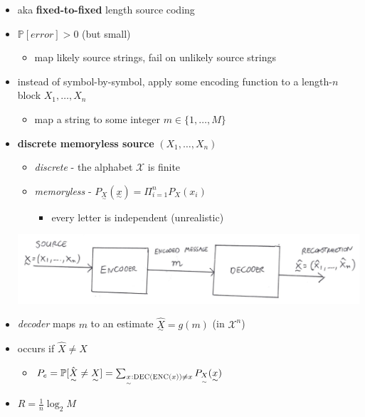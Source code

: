 \documentclass[10pt, landscape]{article}
\begin{document}
\begin{multicols*}{4}
  \begin{itemize}
    \item aka \textbf{fixed-to-fixed} length source coding
    \item $\mathbb{P}[error] > 0$ (but small)
      \begin{itemize}
        \item map likely source strings, fail on unlikely source strings
      \end{itemize}
    \item instead of symbol-by-symbol, apply some encoding function to a length-$n$ block $X_1, \dots, X_n$
      \begin{itemize}
        \item map a string to some integer $m \in \{1, \dots, M\}$
      \end{itemize}
    \item \textbf{discrete memoryless source} $(X_1, \dots, X_n)$ 
      \begin{itemize}
        \item \textit{discrete} - the alphabet $\mathcal{X}$ is finite
        \item \textit{memoryless} - $P_{\underset{\sim}{X}}(\underset{\sim}{x}) = \Pi^n_{i=1} P_X(x_i)$
          \begin{itemize}
            \item every letter is independent (unrealistic)
          \end{itemize}
      \end{itemize}
      \includegraphics[width=0.9\linewidth]{cs3236-blockwise-source-coding.png} 
    \item \textit{decoder} maps $m$ to an estimate $\hat{\underset{\sim}{X}} = g(m)$  (in $\mathcal{X}^n$)
    \item {} occurs if $\hat{X} \neq X$
      \begin{itemize}
        \item $P_e = \mathbb{P}[\hat{\underset{\sim}{X}} \neq {\underset{\sim}{X}}] = \sum_{\underset{\sim}{x}: \textsc{DEC(ENC($x$))} \neq x} P_{\underset{\sim}{X}}(\underset{\sim}{x})$
      \end{itemize}
    \item {} $R = \frac{1}{n}\log_2 M$

\end{itemize}
\end{multicols*}
\end{document}
